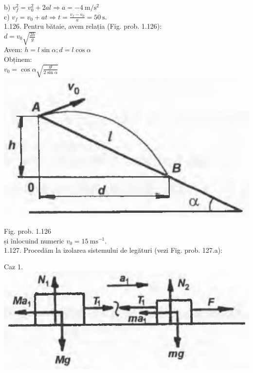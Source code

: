 \documentclass[10pt]{article}
\begin{document}
b) $v_{f}^{2}=v_{0}^{2}+2 a l \Rightarrow a=-4 \mathrm{~m} / \mathrm{s}^{2}$\\
c) $v_{f}=v_{0}+a t \Rightarrow t=\frac{v_{f}-v_{0}}{a}=50 \mathrm{~s}$.\\
1.126. Pentru bătaie, avem relația (Fig. prob. 1.126):\\
$d=v_{0} \sqrt{\frac{2 h}{g}}$\\
Avem: $h=l \sin \alpha ; d=l \cos \alpha$\\
Obținem:\\
$v_{0}=\cos \alpha \sqrt{\frac{g l}{2 \sin \alpha}}$\\
\includegraphics[max width=\textwidth, center]{2025_07_01_5b3ff9fa0d508c8e9f17g-225(1)}

Fig. prob. 1.126\\
și înlocuind numeric $v_{0}=15 \mathrm{~ms}^{-1}$.\\
1.127. Procedăm la izolarea sistemului de legături (vezi Fig. prob. 127.a):

Caz 1.\\
\includegraphics[max width=\textwidth, center]{2025_07_01_5b3ff9fa0d508c8e9f17g-225}
\end{document}
